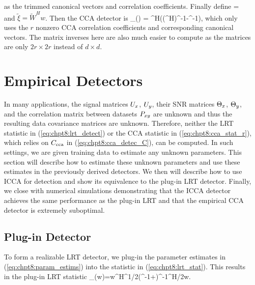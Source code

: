 \ea\ee 
as the trimmed canonical vectors and correlation coefficients. Finally define 
\be
{} =  
\ee and
$\widetilde{\xi} = \widetilde{W}^Hw$. Then the CCA detector is 
\beq\label{eq:chpt8:cca_stat_r}
\Lambda_{}(\widetilde{\xi}) =
\widetilde{\xi}^H\left(\left(^H\right)^{-1}-^{-1}\right)\widetilde{\xi},
\eeq
which only uses the $r$ nonzero CCA correlation coefficients and corresponding 
canonical vectors. The matrix inverses here are also much easier to compute as the
matrices are only $2r\times 2r$ instead of $d\times d$. 

\section{Empirical Detectors}

In many applications, the signal matrices $U_x$, $U_y$, their SNR matrices $\Theta_x$, $\Theta_y$,
and the correlation matrix between datasets $P_{xy}$ are unknown and thus the resulting data
covariance matrices are unknown. Therefore, neither the LRT statistic in
(\ref{eq:chpt8:lrt_detect}) or the CCA statistic in (\ref{eq:chpt8:cca_stat_r}), which
relies on $C_{\text{cca}}$ in (\ref{eq:chpt8:cca_detec_C}), can be computed. In such settings, we
are given training data to estimate any unknown parameters. This section will describe how
to estimate these unknown parameters and use these estimates in the previously derived
detectors. We then will describe how to use ICCA for detection and show its equivalence to
the plug-in LRT detector. Finally, we close with numerical simulations demonstrating that
the ICCA detector achieves the same performance as the plug-in LRT and that the empirical
CCA detector is extremely suboptimal.


\subsection{Plug-in Detector}

To form a realizable LRT detector, we plug-in the parameter estimates in
(\ref{eq:chpt8:param_estims}) into the statistic in
(\ref{eq:chpt8:lrt_stat}). This results in the plug-in LRT statistic
\beq\label{eq:chpt8:plugin_lrt_stat}
\Lambda_(w)=w^H\widehat{\Theta}^{1/2}\left(^{-1}+\widehat{\Theta}\right)^{-1}\widehat{\Theta}^{H/2}w.
\eeq

